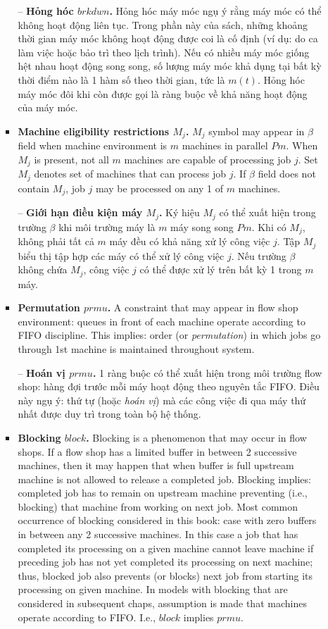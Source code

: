 \documentclass{article}
\begin{document}
\begin{itemize}
\begin{itemize}
\begin{itemize}
            -- {\bf Hỏng hóc $brkdwn$.} Hỏng hóc máy móc ngụ ý rằng máy móc có thể không hoạt động liên tục. Trong phần này của sách, những khoảng thời gian máy móc không hoạt động được coi là cố định (ví dụ: do ca làm việc hoặc bảo trì theo lịch trình). Nếu có nhiều máy móc giống hệt nhau hoạt động song song, số lượng máy móc khả dụng tại bất kỳ thời điểm nào là 1 hàm số theo thời gian, tức là $m(t)$. Hỏng hóc máy móc đôi khi còn được gọi là ràng buộc về khả năng hoạt động của máy móc.
            \item {\bf Machine eligibility restrictions $M_j$.} $M_j$ symbol may appear in $\beta$ field when machine environment is $m$ machines in parallel $Pm$. When $M_j$ is present, not all $m$ machines are capable of processing job $j$. Set $M_j$ denotes set of machines that can process job $j$. If $\beta$ field does not contain $M_j$, job $j$ may be processed on any 1 of $m$ machines.

            -- {\bf Giới hạn điều kiện máy $M_j$.} Ký hiệu $M_j$ có thể xuất hiện trong trường $\beta$ khi môi trường máy là $m$ máy song song $Pm$. Khi có $M_j$, không phải tất cả $m$ máy đều có khả năng xử lý công việc $j$. Tập $M_j$ biểu thị tập hợp các máy có thể xử lý công việc $j$. Nếu trường $\beta$ không chứa $M_j$, công việc $j$ có thể được xử lý trên bất kỳ 1 trong $m$ máy.
            \item {\bf Permutation $prmu$.} A constraint that may appear in flow shop environment: queues in front of each machine operate according to FIFO discipline. This implies: order (or {\it permutation}) in which jobs go through 1st machine is maintained throughout system.

            -- {\bf Hoán vị $prmu$.} 1 ràng buộc có thể xuất hiện trong môi trường flow shop: hàng đợi trước mỗi máy hoạt động theo nguyên tắc FIFO. Điều này ngụ ý: thứ tự (hoặc {\it hoán vị}) mà các công việc đi qua máy thứ nhất được duy trì trong toàn bộ hệ thống.
            \item {\bf Blocking $block$.} Blocking is a phenomenon that may occur in flow shops. If a flow shop has a limited buffer in between 2 successive machines, then it may happen that when buffer is full upstream machine is not allowed to release a completed job. Blocking implies: completed job has to remain on upstream machine preventing (i.e., blocking) that machine from working on next job. Most common occurrence of blocking considered in this book: case with zero buffers in between any 2 successive machines. In this case a job that has completed its processing on a given machine cannot leave machine if preceding job has not yet completed its processing on next machine; thus, blocked job also prevents (or blocks) next job from starting its processing on given machine. In models with blocking that are considered in subsequent chaps, assumption is made that machines operate according to FIFO. I.e., $block$ implies $prmu$.


\end{itemize}
\end{itemize}
\end{itemize}
\end{document}

